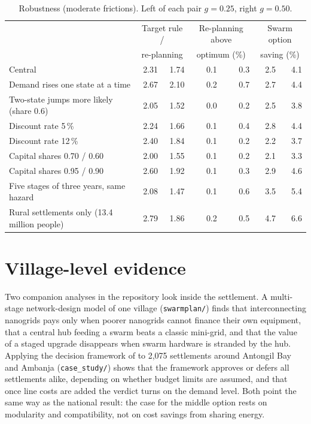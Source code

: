 \documentclass[11pt,a4paper]{article}
\begin{document}
\begin{table}[!ht]\centering\small
\caption{Robustness (moderate frictions). Left of each pair $g=0.25$, right $g=0.50$.}\label{tab:robust}
\begin{tabular}{lrrrrrr}\toprule
 & \multicolumn{2}{c}{Target rule /} & \multicolumn{2}{c}{Re-planning above} & \multicolumn{2}{c}{Swarm option}\\
 & \multicolumn{2}{c}{re-planning} & \multicolumn{2}{c}{optimum (\%)} & \multicolumn{2}{c}{saving (\%)}\\\midrule
Central & 2.31 & 1.74 & 0.1 & 0.3 & 2.5 & 4.1\\
Demand rises one state at a time & 2.67 & 2.10 & 0.2 & 0.7 & 2.7 & 4.4\\
Two-state jumps more likely (share 0.6) & 2.05 & 1.52 & 0.0 & 0.2 & 2.5 & 3.8\\
Discount rate 5\,\% & 2.24 & 1.66 & 0.1 & 0.4 & 2.8 & 4.4\\
Discount rate 12\,\% & 2.40 & 1.84 & 0.1 & 0.2 & 2.2 & 3.7\\
Capital shares 0.70 / 0.60 & 2.00 & 1.55 & 0.1 & 0.2 & 2.1 & 3.3\\
Capital shares 0.95 / 0.90 & 2.60 & 1.92 & 0.1 & 0.3 & 2.9 & 4.6\\
Five stages of three years, same hazard & 2.08 & 1.47 & 0.1 & 0.6 & 3.5 & 5.4\\
Rural settlements only (13.4 million people) & 2.79 & 1.86 & 0.2 & 0.5 & 4.7 & 6.6\\\bottomrule
\end{tabular}
\end{table}

\section{Village-level evidence}
Two companion analyses in the repository look inside the settlement. A multi-stage network-design model of one
village (\texttt{swarmplan/}) finds that interconnecting nanogrids pays only when poorer nanogrids cannot finance
their own equipment, that a central hub feeding a swarm beats a classic mini-grid, and that the value of a staged
upgrade disappears when swarm hardware is stranded by the hub. Applying the decision framework of
\citet{ouanes2026} to 2,075 settlements around Antongil Bay and Ambanja (\texttt{case\_study/}) shows that the
framework approves or defers all settlements alike, depending on whether budget limits are assumed, and that once
line costs are added the verdict turns on the demand level. Both point the same way as the national result: the
case for the middle option rests on modularity and compatibility, not on cost savings from sharing energy.
\end{document}
